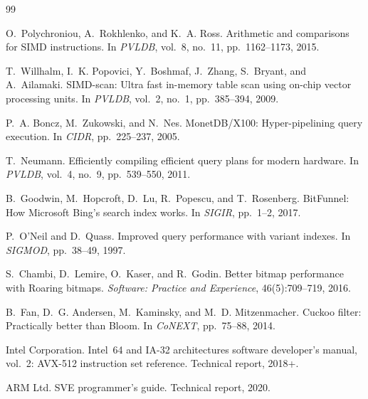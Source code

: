 \documentclass[10pt]{article}
\theoremstyle{definition}
\begin{document}
\begin{thebibliography}{99}

O.~Polychroniou, A.~Rokhlenko, and K.~A. Ross.
\newblock Arithmetic and comparisons for SIMD instructions.
\newblock In \emph{PVLDB}, vol.~8, no.~11, pp.~1162--1173, 2015.

T.~Willhalm, I.~K. Popovici, Y.~Boshmaf, J.~Zhang, S.~Bryant, and A.~Ailamaki.
\newblock SIMD-scan: Ultra fast in-memory table scan using on-chip vector processing units.
\newblock In \emph{PVLDB}, vol.~2, no.~1, pp.~385--394, 2009.

P.~A. Boncz, M.~Zukowski, and N.~Nes.
\newblock MonetDB/X100: Hyper-pipelining query execution.
\newblock In \emph{CIDR}, pp.~225--237, 2005.

T.~Neumann.
\newblock Efficiently compiling efficient query plans for modern hardware.
\newblock In \emph{PVLDB}, vol.~4, no.~9, pp.~539--550, 2011.

B.~Goodwin, M.~Hopcroft, D.~Lu, R.~Popescu, and T.~Rosenberg.
\newblock BitFunnel: How Microsoft Bing's search index works.
\newblock In \emph{SIGIR}, pp.~1--2, 2017.

P.~O'Neil and D.~Quass.
\newblock Improved query performance with variant indexes.
\newblock In \emph{SIGMOD}, pp.~38--49, 1997.

S.~Chambi, D.~Lemire, O.~Kaser, and R.~Godin.
\newblock Better bitmap performance with Roaring bitmaps.
\newblock \emph{Software: Practice and Experience}, 46(5):709--719, 2016.

B.~Fan, D.~G. Andersen, M.~Kaminsky, and M.~D. Mitzenmacher.
\newblock Cuckoo filter: Practically better than Bloom.
\newblock In \emph{CoNEXT}, pp.~75--88, 2014.

Intel Corporation.
\newblock Intel\textregistered\ 64 and IA-32 architectures software developer's manual, vol.~2: AVX-512 instruction set reference.
\newblock Technical report, 2018+.

ARM Ltd.
\newblock SVE programmer's guide.
\newblock Technical report, 2020.


\end{thebibliography}
\end{document}
